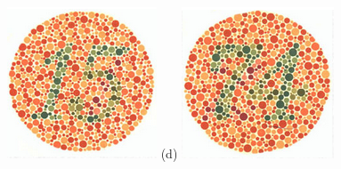 \documentclass[	12pt, Times, openright, twoside, a4paper, english, brazil]{abntex2}
\begin{document}
\begin{apendicesenv}
\begin{figure}[!htb]
\centering
{\includegraphics[width=\linewidth]{ishihara-transformacao/figureIshihara8.png}}
(d)
\endminipage\hfill
{}
\centering
{\includegraphics[width=\linewidth]{ishihara-transformacao/figureIshihara9.png}}

\end{figure}
\end{apendicesenv}
\end{document}
